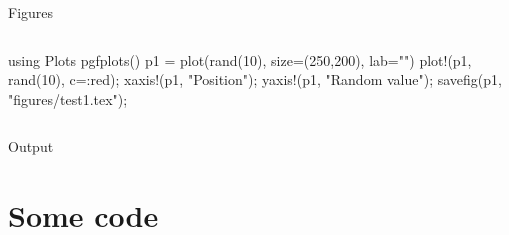 \documentclass[11pt, compress, aspectratio=1610, serif]{beamer}
\newenvironment{Shaded}{}{}
\newcommand{\FloatTok}[1]{\textcolor[rgb]{0.25,0.63,0.44}{{#1}}}
\newcommand{\StringTok}[1]{\textcolor[rgb]{0.25,0.44,0.63}{{#1}}}
\newcommand{\NormalTok}[1]{{#1}}
\newcommand{\begincols}{\begin{columns}}
\newcommand{\stopcols}{\end{columns}}
\begin{document}
\begin{frame}[fragile]{Figures}

\begincols
{}

\begin{Shaded}
\begin{Highlighting}[]
\NormalTok{using Plots}
\NormalTok{pgfplots()}
\NormalTok{p1 = plot(rand(}\FloatTok{10}\NormalTok{),}
  \NormalTok{size=(}\FloatTok{250}\NormalTok{,}\FloatTok{200}\NormalTok{),}
  \NormalTok{lab=}\StringTok{""}\NormalTok{)}
\NormalTok{plot!(p1, rand(}\FloatTok{10}\NormalTok{), c=:red);}
\NormalTok{xaxis!(p1, }\StringTok{"Position"}\NormalTok{);}
\NormalTok{yaxis!(p1, }\StringTok{"Random value"}\NormalTok{);}
\NormalTok{savefig(p1, }\StringTok{"figures/test1.tex"}\NormalTok{);}
\end{Highlighting}
\end{Shaded}

\hfill{}



\stopcols

\end{frame}

\begin{frame}{Output}

\end{frame}

\section{Some code}\label{some-code}
\end{document}
